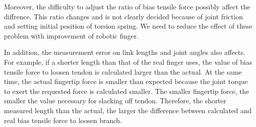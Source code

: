 \documentclass{llncs}
\begin{document}
Moreover, the difficulty to adjust the ratio of bias tensile force possibly affect the diffrence.
This ratio changes and is not clearly decided because of joint friction and setting initial position of torsion spring.
We need to reduce the effect of these problem with improvement of robotic finger.

In addition, the measurement error on link lengths and joint angles also affects.
For example, if a shorter length than that of the real finger uses, 
the value of bias tensile force to loosen tendon is calculated larger than the actual.
At the same time, the actual fingertip force is smaller than expected 
because the joint torque to exert the requested force is calculated smaller.
The smaller fingertip force, the smaller the value necessary for slacking off tendon.
Therefore, the shorter measured length than the actual, 
the larger the difference between calculated and real bias tensile force to loosen branch. 


\end{document}
